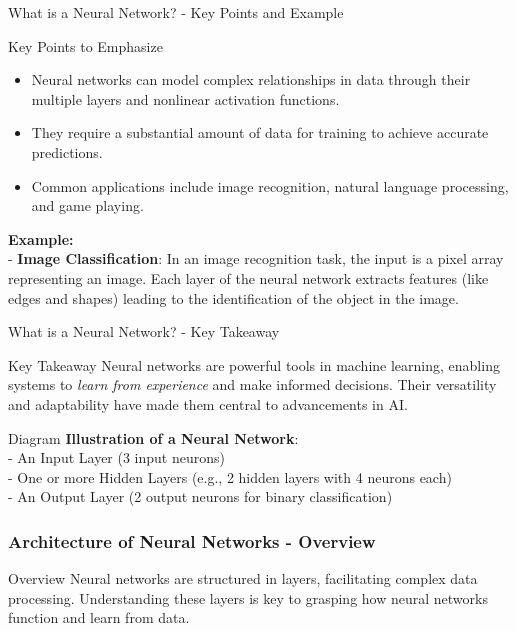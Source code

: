 \documentclass[aspectratio=169]{beamer}
\begin{document}
\begin{frame}[fragile]{What is a Neural Network? - Key Points and Example}
    \begin{block}{Key Points to Emphasize}
        \begin{itemize}
            \item Neural networks can model complex relationships in data through their multiple layers and nonlinear activation functions.
            \item They require a substantial amount of data for training to achieve accurate predictions.
            \item Common applications include image recognition, natural language processing, and game playing.
        \end{itemize}
    \end{block}

    \textbf{Example:} \\
    - \textbf{Image Classification}: In an image recognition task, the input is a pixel array representing an image. Each layer of the neural network extracts features (like edges and shapes) leading to the identification of the object in the image.
\end{frame}

\begin{frame}[fragile]{What is a Neural Network? - Key Takeaway}
    \begin{block}{Key Takeaway}
        Neural networks are powerful tools in machine learning, enabling systems to \textit{learn from experience} and make informed decisions. Their versatility and adaptability have made them central to advancements in AI.
    \end{block}
    
    \begin{block}{Diagram}
        \textbf{Illustration of a Neural Network}:\\
        - An Input Layer (3 input neurons) \\
        - One or more Hidden Layers (e.g., 2 hidden layers with 4 neurons each) \\
        - An Output Layer (2 output neurons for binary classification)
    \end{block}
\end{frame}

\begin{frame}[fragile]
    \frametitle{Architecture of Neural Networks - Overview}
    \begin{block}{Overview}
        Neural networks are structured in layers, facilitating complex data processing. 
        Understanding these layers is key to grasping how neural networks function and learn from data.
    \end{block}
\end{frame}
\end{document}
